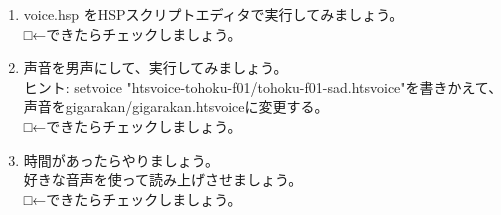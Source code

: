 \begin{tcolorbox}[title=\useOmetoi]
\begin{enumerate}
\item voice.hsp をHSPスクリプトエディタで実行してみましょう。\\□←できたらチェックしましょう。
\item 声音を男声にして、実行してみましょう。\\ヒント: setvoice "htsvoice-tohoku-f01/tohoku-f01-sad.htsvoice"を書きかえて、声音をgigarakan/gigarakan.htsvoiceに変更する。\\□←できたらチェックしましょう。
\item 時間があったらやりましょう。\\好きな音声を使って読み上げさせましょう。\\□←できたらチェックしましょう。
\end{enumerate}
\end{tcolorbox}
